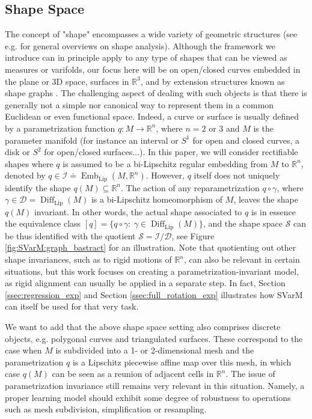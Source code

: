 \documentclass[11pt]{article}
\newcommand{\R}{\mathbb{R}}
\begin{document}
\subsection{Shape Space} 
The concept of "shape" encompasses a wide variety of geometric structures (see e.g. \cite{younes2019shapes,bauer2014overview,srivastava2016functional} for general overviews on shape analysis). Although the framework we introduce can in principle apply to any type of shapes that can be viewed as measures or varifolds, our focus here will be on open/closed curves embedded in the plane or 3D space, surfaces in $\R^3$, and by extension structures known as shape graphs \cite{sukurdeep2022new,bal2024statistical}. The challenging aspect of dealing with such objects is that there is generally not a simple nor canonical way to represent them in a common Euclidean or even functional space. Indeed, a curve or surface is usually defined by a parametrization function $q:M \rightarrow \R^n$, where $n=2$ or $3$ and $M$ is the parameter manifold (for instance an interval or $S^1$ for open and closed curves, a disk or $S^2$ for open/closed surfaces$\ldots$). In this paper, we will consider rectifiable shapes where $q$ is assumed to be a bi-Lipschitz regular embedding from $M$ to $\R^n$, denoted by $q\in \mathcal{I} \doteq \operatorname{Emb}_{\text{Lip}}(M,\R^n)$. However, $q$ itself does not uniquely identify the shape $q(M)\subseteq \R^n$. The action of any reparametrization $q \circ \gamma$, where $\gamma \in \mathcal{D} = \operatorname{Diff}_{\text{Lip}}(M)$ is a bi-Lipschitz homeomorphism of $M$, leaves the shape $q(M)$ invariant. In other words, the actual shape associated to $q$ is in essence the equivalence class $[q]=\{q \circ \gamma: \ \gamma \in \operatorname{Diff}_{\text{Lip}}(M)\}$, and the shape space $\mathcal{S}$ can be thus identified with the quotient $\mathcal{S} = \mathcal{I}/\mathcal{D}$, see Figure \ref{fig:SVarM:graph_bastract} for an illustration. Note that quotienting out other shape invariances, such as to rigid motions of $\R^n$, can also be relevant in certain situations, but this work focuses on creating a parametrization-invariant model, as rigid alignment can usually be applied in a separate step. In fact, Section \ref{ssec:regression_exp} and Section \ref{ssec:full_rotation_exp} illustrates how SVarM can itself be used for that very task.

We want to add that the above shape space setting also comprises discrete objects, e.g. polygonal curves and triangulated surfaces. These correspond to the case when $M$ is subdivided into a 1- or 2-dimensional mesh and the parametrization $q$ is a Lipschitz piecewise affine map over this mesh, in which case $q(M)$ can be seen as a reunion of adjacent cells in $\R^n$. The issue of parametrization invariance still remains very relevant in this situation. Namely, a proper learning model should exhibit some degree of robustness to operations such as mesh subdivision, simplification or resampling.
\end{document}
